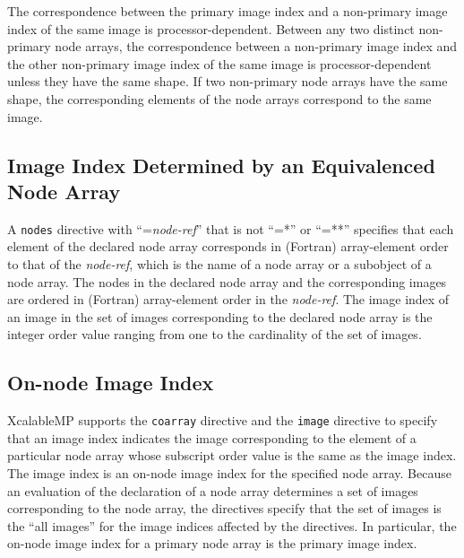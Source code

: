The correspondence between the primary image index and a non-primary image
index of the same image is processor-dependent.
Between any two distinct non-primary node arrays, 
the correspondence between a non-primary image index 
and the other non-primary image index of the same image is
processor-dependent unless they have the same shape. 
If two non-primary node arrays have the same shape,
the corresponding elements of the node arrays correspond
to the same image.


%


\subsection{Image Index Determined by an Equivalenced Node Array}

A {\tt nodes} directive with ``={\it node-ref}'' that is not ``=*'' or
``=**''
specifies that
each element of the declared node array corresponds in (Fortran)
array-element order
to that of the {\it node-ref},
which is the name of a node array or a subobject of a node array.
The nodes in the declared node array and the corresponding images 
are ordered in (Fortran) array-element order in the {\it node-ref}.
The image index of an image in the set of images
corresponding to the declared node array
is the integer order value ranging from one to the cardinality of the
set of images.


\subsection{On-node Image Index}

XcalableMP supports the {\tt coarray} directive and the {\tt image}
directive to 
specify that an image index indicates the image corresponding to
the element of a particular node array whose subscript order value is 
the same as the image index.
The image index is an on-node image index for the specified node array. 
Because an evaluation of the declaration of a node array 
determines a set of images corresponding to the node array,
the directives specify that the set of images 
is the ``all images'' for the image indices affected by the directives.
In particular, the on-node image index for a primary node array
is the primary image index. 


